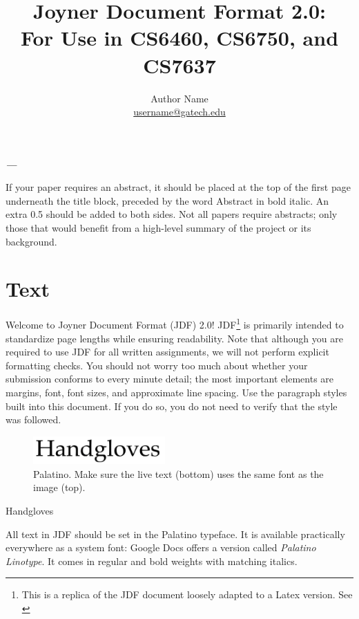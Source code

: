 \documentclass[11pt,a4paper,usenames,dvipsnames]{article}
\title{\LARGE \textbf{Joyner Document Format 2.0:\\
For Use in CS6460, CS6750, and CS7637
} }
\author{Author Name \\ \href{mailto:username@gatech.edu}{username@gatech.edu}}
\date{}
\renewenvironment{abstract}{%
  \list{}{\leftmargin0.5in \rightmargin\leftmargin}
  \item\relax
   \par{\bfseries \noindent \textit{\abstractname—}\nolinebreak} 
}{%
  \endlist \par
}
\begin{document}
\clearpage\maketitle
\maketitle              %
%
\begin{abstract}
If your paper requires an abstract, it should be placed at the top of the first page underneath the title block, preceded by the word Abstract in bold italic. An extra 0.5 should be added to both sides. Not all papers require abstracts; only those that would benefit from a high-level summary of the project or its background.
\end{abstract}

\section{Text}
Welcome to Joyner Document Format (JDF) 2.0! JDF\footnote{This is a replica of the JDF document loosely adapted to a Latex version. See \cite{jn2019}} is primarily intended to standardize page lengths while ensuring readability. Note that although you are required to use JDF for all written assignments, we will not perform explicit formatting checks. You should not worry too much about whether your submission conforms to every minute detail; the most important elements are margins, font, font sizes, and approximate line spacing. Use the paragraph styles built into this document. If you do so, you do not need to verify that the style was followed.
\begin{figure}[H]
\centering
\includegraphics[width=0.45\textwidth]{palantino.png}
\caption{\label{fig:pie} Palatino. Make sure the live text (bottom) uses the same font as the image (top).}
\end{figure}
\begin{center}
{\fontsize{30}{30}\selectfont Handgloves}
\end{center}

All text in JDF should be set in the Palatino typeface. It is available practically everywhere as a system font: Google Docs offers a version called \textit{Palatino Linotype}. It comes in regular and bold weights with matching italics.
\end{document}
